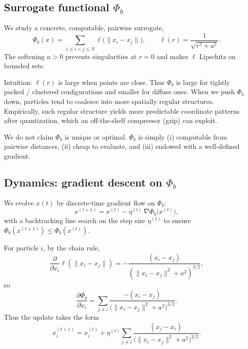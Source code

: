 \documentclass[11pt,a4paper]{article}
\numberwithin{equation}{section}
\newcommand{\norm}[1]{\lVert #1\rVert}
\newcommand{\phib}{\Phi_b}
\begin{document}
\subsection{Surrogate functional $\phib$}
We study a concrete, computable, pairwise surrogate,
\begin{equation}
\label{eq:phib-def}
\phib(x)
= \sum_{1 \le i < j \le N} \ell\!\big( \norm{x_i - x_j} \big),
\qquad
\ell(r) = \frac{1}{\sqrt{r^2 + a^2}}.
\end{equation}
The softening $a>0$ prevents singularities at $r{=}0$ and makes $\ell$ Lipschitz on bounded sets.

Intuition: $\ell(r)$ is large when points are close. Thus $\phib$ is large for tightly packed / clustered configurations and smaller for diffuse ones. When we push $\phib$ down, particles tend to coalesce into more spatially regular structures. Empirically, such regular structure yields more predictable coordinate patterns after quantization, which an off-the-shelf compressor (gzip) can exploit.

We do not claim $\phib$ is unique or optimal. $\phib$ is simply (i) computable from pairwise distances, (ii) cheap to evaluate, and (iii) endowed with a well-defined gradient.

\subsection{Dynamics: gradient descent on $\phib$}
We evolve $x(t)$ by discrete-time gradient flow on $\phib$:
\begin{equation}
\label{eq:update}
x^{(t+1)} = x^{(t)} - \eta^{(t)} \, \nabla \phib \big( x^{(t)} \big),
\end{equation}
with a backtracking line search on the step size $\eta^{(t)}$ to ensure $\phib(x^{(t+1)}) \le \phib(x^{(t)})$.

For particle $i$, by the chain rule,
\begin{equation}
\frac{\partial}{\partial x_i} \ell(\norm{x_i-x_j})
= - \frac{(x_i-x_j)}{(\norm{x_i-x_j}^2+a^2)^{3/2}},
\end{equation}
so
\begin{equation}
\label{eq:gradphib}
\frac{\partial \phib}{\partial x_i}
= \sum_{j \neq i}
\frac{-(x_i - x_j)}{\big(\norm{x_i-x_j}^2 + a^2\big)^{3/2}}.
\end{equation}
Thus the update takes the form
\begin{equation}
\label{eq:force-like}
x_i^{(t+1)} =
x_i^{(t)} + \eta^{(t)} \sum_{j \neq i}
\frac{(x_j - x_i)}{\big(\norm{x_i-x_j}^2 + a^2\big)^{3/2}}.
\end{equation}
\end{document}
